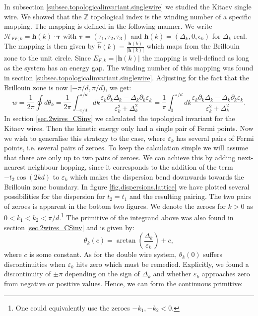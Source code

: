 In subsection \ref{subsec.topologicalinvariant.singlewire} we studied the Kitaev single wire. We showed that the $\mathbb{Z}$ topological index is the winding number of a specific mapping. The mapping is defined in the following manner. We write $\mathcal{H}_{FF,k} = \mathbf{h}(k)\cdot \boldsymbol\tau$ with $\boldsymbol\tau = (\tau_1, \tau_2, \tau_3)$ and $\mathbf{h}(k) = (\Delta_k, 0, \epsilon_k)$ for $\Delta_k$ real. The mapping is then given by $\hat{h}(k) = \frac{\mathbf{h}(k)}{|\mathbf{h}(k)|}$ which maps from the Brillouin zone to the unit circle. Since $E_{F,k} = |\mathbf{h}(k)|$ the mapping is well-defined as long as the system has an energy gap. The winding number of this mapping was found in section \ref{subsec.topologicalinvariant.singlewire}. Adjusting for the fact that the Brillouin zone is now $[-\pi/d, \pi/d)$, we get:
\begin{equation}
w = \frac{1}{2\pi}\oint d\theta_k = \frac{1}{2\pi}\int_{-\pi/d}^{\pi/d} dk \frac{\varepsilon_k\partial_k\Delta_k - \Delta_k\partial_k\varepsilon_k}{\varepsilon^2_k + \Delta^2_k} = \frac{1}{\pi}\int_{0}^{\pi/d} dk \frac{\varepsilon_k\partial_k\Delta_k - \Delta_k\partial_k\varepsilon_k}{\varepsilon^2_k + \Delta^2_k}. 
\label{eq.windingnumber.kitaevmodel}
\end{equation} 
In section \ref{sec.2wires_CSinv} we calculated the topological invariant for the Kitaev wires. Then the kinetic energy only had a single pair of Fermi points. Now we wish to generalise this strategy to the case, where $\varepsilon_k$ has several pairs of Fermi points, i.e. several pairs of zeroes. To keep the calculation simple we will assume that there are only up to two pairs of zeroes. We can achieve this by adding next-nearest neighbour hopping, since it corresponds to the addition of the term $-t_2\cos(2kd)$ to $\varepsilon_k$ which makes the dispersion bend downwards towards the Brillouin zone boundary. In figure \ref{fig.dispersions.lattice} we have plotted several possibilities for the dispersion for $t_2 = t_1$ and the resulting pairing. The two pairs of zeroes is apparent in the bottom two figures. We denote the zeroes for $k > 0$ as $0 < k_1 < k_2 < \pi / d$.\footnote{One could equivalently use the zeroes $-k_1, -k_2 < 0$.} The primitive of the integrand above was also found in section \ref{sec.2wires_CSinv} and is given by:
\begin{equation}
\theta_k(c) = \arctan\left(\frac{\Delta_k}{\varepsilon_k}\right) + c, \nonumber
\end{equation}
where $c$ is some constant. As for the double wire system, $\theta_k(0)$ suffers discontinuities when $\varepsilon_k$ hits zero which must be remedied. Explicitly, we found a discontinuity of $\pm \pi$ depending on the sign of $\Delta_k$ and whether $\varepsilon_k$ approaches zero from negative or positive values. Hence, we can form the continuous primitive:
